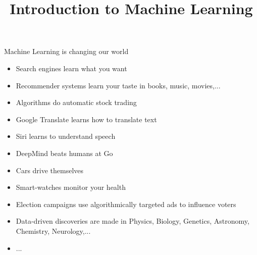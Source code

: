 \documentclass[11pt,compress,t,notes=noshow, xcolor=table]{beamer}
\title{Introduction to Machine Learning}
\institute{\href{https://compstat-lmu.github.io/lecture_i2ml/}{compstat-lmu.github.io/lecture\_i2ml}}
\date{}
\begin{document}






\sloppy


\begin{frame}{Machine Learning is changing our world}

\begin{itemize}

  \item Search engines learn what you want
  
  \item Recommender systems learn your taste in books, music, movies,...
  
  \item Algorithms do automatic stock trading
  
  \item Google Translate learns how to translate text
  
  \item Siri learns to understand speech
  
  \item DeepMind beats humans at Go
  
  \item Cars drive themselves
  
  
  \item Smart-watches monitor your health
  
  \item Election campaigns use algorithmically targeted ads to influence voters
  
  \item Data-driven discoveries are made in Physics, Biology, Genetics, 
  Astronomy, Chemistry, Neurology,...
  
  \item ...
  
\end{itemize}

\end{frame}
\end{document}
